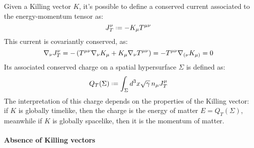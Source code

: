 Given a Killing vector $ K $, it's possible to define a conserved current associated to the energy-momentum tensor as:
\begin{equation}
  J_T^\nu \defeq - K_\mu T^{\mu \nu}
  \label{eq:4.50}
\end{equation}
This current is covariantly conserved, as:
\begin{equation*}
  \nabla_\nu J_T^\nu = - \left( T^{\mu \nu} \nabla_\nu K_\mu + K_\mu \nabla_\nu T^{\mu \nu} \right) = - T^{\mu \nu} \nabla_{(\nu} K_{\mu)} = 0
\end{equation*}
Its associated conserved charge on a spatial hypersurface $ \Sigma $ is defined as:
\begin{equation}
  Q_T(\Sigma) \defeq \int_\Sigma d^3 x \sqrt{\gamma}\, n_\mu J_T^\mu
  \label{eq:4.51}
\end{equation}
The interpretation of this charge depends on the properties of the Killing vector: if $ K $ is globally timelike, then the charge is the energy of matter $ E = Q_T(\Sigma) $, meanwhile if $ K $ is globally spacelike, then it is the momentum of matter.

\paragraph{Absence of Killing vectors}

